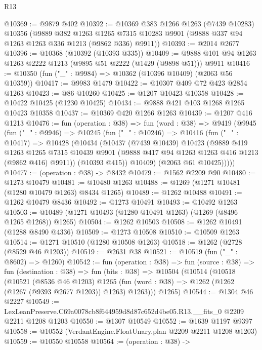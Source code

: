 \begin{lexlean}{R13}
\begin{coremodule}
@10369 := @9879 @402
@10392 := @10369
    @383
    @1266
    @1263
    (@7439 @10283)
    @10356
    (@9889
      @382
      @1263
      @1265
      @7315
      @10283
      @9901
      (@9888 @337 @94 @1263 @1263 @336 @1213 (@9862 @336) @9911))
@10393 := @2014 @2677
@10396 := @10368 (@10392 (@10393 @335))
@10409 := @9888 @101 @94 @1263 @1263 @2222 @1213 (@9895 @51 @2222 (@1429 (@9898 @51))) @9911
@10416 := @10350 (fun ("_" : @9984) => @10362 (@10396 @10409) (@2063 @56 @10359))
@10417 := @9983 @1479
@10422 := @10307 @409 @72 @423 @2854 @1263
@10423 := @86 @10260
@10425 := @1207 @10423 @10358
@10428 := @10422 @10425 (@1230 @10425)
@10434 := @9888 @421 @103 @1268 @1265 @10423 @10358
@10437 := @10369 @420 @1266 @1263
@10439 := @1207 @416 @1213
@10476 := fun (operation : @38) =>
  fun (word : @38) =>
  @9419
    (@9945
      (fun ("_" : @9946) =>
      @10245
        (fun ("_" : @10246) =>
        @10416
          (fun ("_" : @10417) =>
          @10428
            (@10434
              (@10437
                (@7439 @10439)
                @10423
                (@9889
                  @419
                  @1263
                  @1265
                  @7315
                  @10439
                  @9901
                  (@9888 @417 @94 @1263 @1263 @416 @1213 (@9862 @416) @9911))
                (@10393 @415))
              @10409)
            (@2063 @61 @10425)))))
@10477 := (operation : @38) -> @8432
@10479 := @1562 @2209 @90
@10480 := @1273 @10479
@10481 := @10480 @1263
@10488 := @1269 (@1271 @10481 (@1280 @10479 @1263) @8434 @1265)
@10489 := @1262 @10488
@10491 := @1262 @10479 @8436
@10492 := @1273 @10491
@10493 := @10492 @1263
@10503 := @10489 (@1271 @10493 (@1280 @10491 @1263) (@1269 (@8496 @1265 @1268)) @1265)
@10504 := @1262 @10503
@10508 := @1262 @10491 (@1288 @8490 @4336)
@10509 := @1273 @10508
@10510 := @10509 @1263
@10514 := @1271 @10510 (@1280 @10508 @1263)
@10518 := @1262 (@2728 (@8529 @46 @1203))
@10519 := @2631 @38
@10521 := @10519 (fun ("_" : @8602) => @1260)
@10542 := fun (operation : @38) =>
  fun (source : @38) =>
  fun (destination : @38) =>
  fun (bits : @38) =>
  @10504
    (@10514
      (@10518
        (@10521
          (@8536 @46 @1203)
          @1265
          (fun (word : @38) => @1262 (@1262 (@1267 (@9393 @2677 @1203)) @1263) @1263)))
      @1265)
@10544 := @1304 @46 @2227
@10549 := LexLeanPreserve.C69a0078cb8f644959d8d87c652d4be05.R13.__fits_0 @2209 @2211 @1208 @1203
@10550 := @1307 @10549
@10552 := @1639 @1197 @9397
@10558 := @10552 (VerdantEngine.FloatUnary.plan @2209 @2211 @1208 @1203)
@10559 := @10550 @10558
@10564 := (operation : @38) ->

\end{coremodule}
\end{lexlean}
